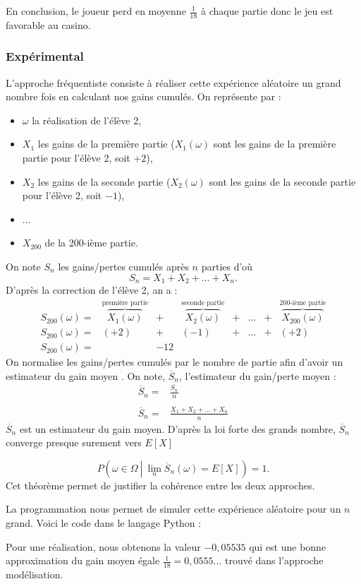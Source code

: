\documentclass{book}
\begin{document}
En conclusion, le joueur perd en moyenne $\frac{1}{18}$ à chaque partie donc le jeu est favorable au casino.



\subsubsection*{Expérimental} L'approche fréquentiste consiste à réaliser cette expérience aléatoire un grand nombre fois en calculant nos gains cumulés. On représente par :
\begin{itemize}
\item $\omega$  la réalisation de l'élève 2,
\item $X_1$ les gains de la première partie ($X_1(\omega)$ sont les gains de la première partie pour l'élève 2, soit $+2$),
\item $X_2$ les gains de la seconde partie ($X_2(\omega)$ sont les gains de la seconde partie pour l'élève 2, soit $-1$),
\item ... 
\item $X_{200}$ de la 200-ième partie.
\end{itemize}
On note $S_n$ les gains/pertes cumulés après $n$ parties d'où \[S_n=X_1+X_2+\dots+X_n.\]
D'après la correction de l'élève 2, an a :
\[
\begin{matrix}
S_{200}(\omega)=&\overbrace{X_1(\omega)}^{\text{première partie}} &+ & \overbrace{X_2(\omega)}^{\text{seconde partie}} &+&\dots&+&\overbrace{X_{200}(\omega)}^{\text{200-ième partie}}\\
S_{200}(\omega)=&(+2)&+& (-1)&+&\dots&+&(+2)\\
S_{200}(\omega)=&&-12
\end{matrix}
\]
On normalise les gains/pertes cumulés par le nombre de partie afin d'avoir un estimateur du gain moyen . On note, $\overline S_n$, l'estimateur du gain/perte moyen :
\[
\begin{matrix}
\overline S_n = & \frac{S_n}{n}\\
\\
\overline S_n = & \frac{X_1+X_2+\dots+X_n}{n}
\end{matrix}
\]
$\overline S_n$ est un estimateur du gain moyen. D'après la loi forte des grands nombre, $\overline S_n$ converge presque surement vers $E\left[X\right]$

\[
P\left(\omega\in\Omega\ \left|\ \lim_{n}\overline S_n(\omega)=E\left[X\right]\right.\right)=1.
\] 
Cet théorème permet de justifier la cohérence entre les deux approches.  


La programmation nous permet de simuler cette expérience aléatoire pour un $n$ grand. Voici le code dans le langage Python : 

Pour une réalisation, nous obtenons la valeur $-0,05535$ qui est une bonne approximation du gain moyen égale $\frac{1}{18}=0,0555...$ trouvé dans l'approche modélisation.
    
\end{document}
